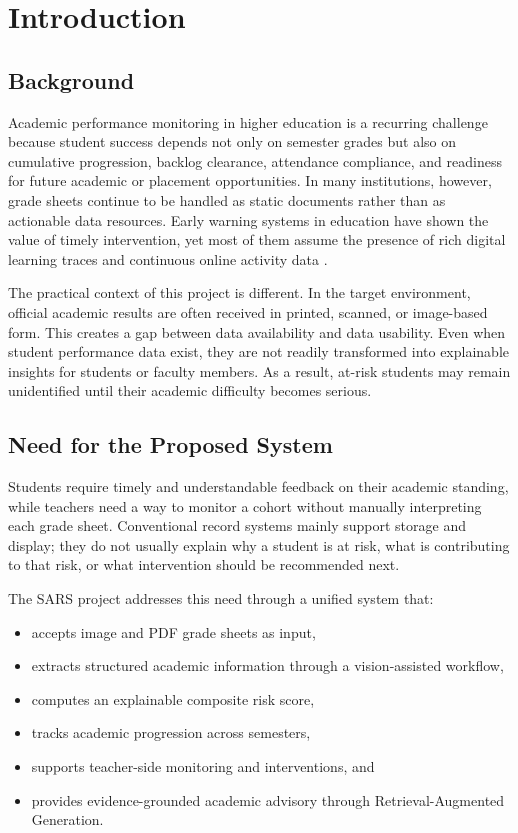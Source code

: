 \chapter{Introduction}

\section{Background}
Academic performance monitoring in higher education is a recurring challenge because student success depends not only on semester grades but also on cumulative progression, backlog clearance, attendance compliance, and readiness for future academic or placement opportunities. In many institutions, however, grade sheets continue to be handled as static documents rather than as actionable data resources. Early warning systems in education have shown the value of timely intervention, yet most of them assume the presence of rich digital learning traces and continuous online activity data \cite{baker2014edm,essa2012predictive,arnold2012course}.

The practical context of this project is different. In the target environment, official academic results are often received in printed, scanned, or image-based form. This creates a gap between data availability and data usability. Even when student performance data exist, they are not readily transformed into explainable insights for students or faculty members. As a result, at-risk students may remain unidentified until their academic difficulty becomes serious.

\section{Need for the Proposed System}
Students require timely and understandable feedback on their academic standing, while teachers need a way to monitor a cohort without manually interpreting each grade sheet. Conventional record systems mainly support storage and display; they do not usually explain why a student is at risk, what is contributing to that risk, or what intervention should be recommended next.

The SARS project addresses this need through a unified system that:
\begin{itemize}[leftmargin=*]
\item accepts image and PDF grade sheets as input,
\item extracts structured academic information through a vision-assisted workflow,
\item computes an explainable composite risk score,
\item tracks academic progression across semesters,
\item supports teacher-side monitoring and interventions, and
\item provides evidence-grounded academic advisory through Retrieval-Augmented Generation.
\end{itemize}

